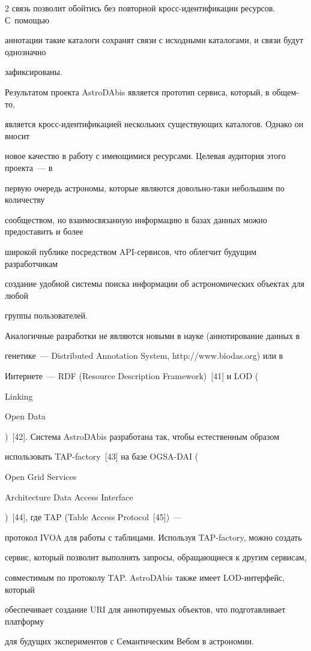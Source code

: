 \begin{multicols}{2}
связь позволит обойтись без повторной кросс-иден\-ти\-фи\-ка\-ции ресурсов. С~по\-мощью 

аннотации такие каталоги сохранят связи с исходными каталогами, и связи будут однозначно 

зафиксированы.

      

      Результатом проекта AstroDAbis является прототип сервиса, который, в общем-то, 

является кросс-иден\-ти\-фи\-ка\-ци\-ей нескольких существующих каталогов. Однако он вносит 

новое качество в работу с имеющимися ресурсами. Целевая аудитория этого проекта~--- в 

первую очередь астрономы, которые являются довольно-таки небольшим по количеству 

сообществом, но взаимосвязанную информацию в базах данных можно предоставить и более 

широкой публике посредством API-сер\-ви\-сов, что облегчит будущим разработчикам 

создание удобной системы поиска информации об астрономических объектах для любой 

группы пользователей.

      

      Аналогичные разработки не являются новыми в науке (аннотирование данных в 

генетике~--- {Distributed Annotation System}, {\sf http://www.biodas.org}) или в 

Интернете~--- RDF ({Resource Description Framework})~[41] и LOD ({Linking 

Open Data})~[42]. Сис\-те\-ма AstroDAbis разработана так, чтобы естественным образом 

использовать TAP-factory~[43] на базе OGSA-DAI ({Open Grid Services 

Architecture Data Access Interface})~[44], где TAP ({Table Access Protocol}~[45])~--- 

протокол IVOA для работы с таб\-ли\-ца\-ми. Используя TAP-factory, можно создать 

сервис, который позволит выполнять запросы, об\-ра\-ща\-ющи\-еся к другим сервисам, 

совместимым по протоколу TAP. AstroDAbis также имеет LOD-ин\-тер\-фейс, который 

обеспечивает создание URI для аннотируемых объектов, что подготавливает платформу 

для будущих экспериментов с Семантическим Вебом в астрономии. 


\end{multicols}
